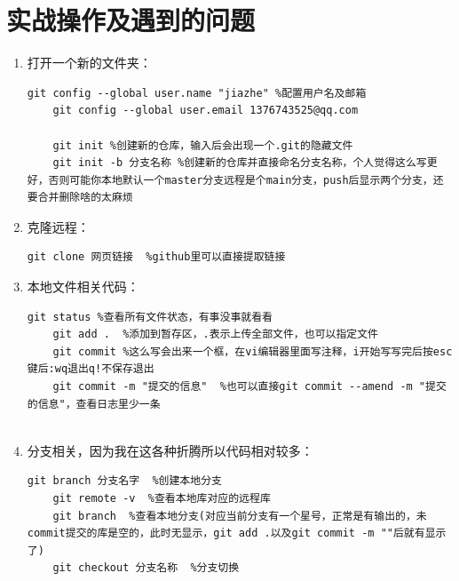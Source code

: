 \documentclass{article}
\begin{document}
\section{实战操作及遇到的问题}
\begin{enumerate}
\item 打开一个新的文件夹：
\begin{lstlisting}[breaklines=true]
	git config --global user.name "jiazhe" %配置用户名及邮箱
	git config --global user.email 1376743525@qq.com
	
	git init %创建新的仓库，输入后会出现一个.git的隐藏文件
	git init -b 分支名称 %创建新的仓库并直接命名分支名称，个人觉得这么写更好，否则可能你本地默认一个master分支远程是个main分支，push后显示两个分支，还要合并删除啥的太麻烦
\end{lstlisting}

\item 克隆远程：
\begin{lstlisting}[breaklines=true]
	git clone 网页链接  %github里可以直接提取链接
\end{lstlisting}	
	
\item 本地文件相关代码：
\begin{lstlisting}[breaklines=true]
	git status %查看所有文件状态，有事没事就看看
	git add .  %添加到暂存区，.表示上传全部文件，也可以指定文件
	git commit %这么写会出来一个框，在vi编辑器里面写注释，i开始写写完后按esc键后:wq退出q!不保存退出
	git commit -m "提交的信息"  %也可以直接git commit --amend -m "提交的信息"，查看日志里少一条
	
\end{lstlisting}	

\item 分支相关，因为我在这各种折腾所以代码相对较多：
\begin{lstlisting}[breaklines=true]
	git branch 分支名字  %创建本地分支
	git remote -v  %查看本地库对应的远程库
	git branch  %查看本地分支(对应当前分支有一个星号，正常是有输出的，未commit提交的库是空的，此时无显示，git add .以及git commit -m ""后就有显示了)
	git checkout 分支名称  %分支切换
	
				
\end{lstlisting}


\end{enumerate}
\end{document}
